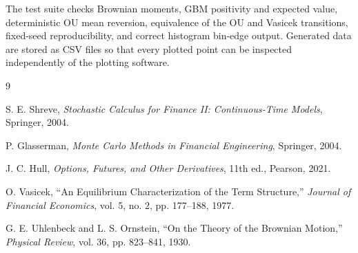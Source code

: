 \documentclass[11pt,a4paper]{article}
\begin{document}
The test suite checks Brownian moments, GBM positivity and expected value, deterministic OU mean reversion, equivalence of the OU and Vasicek transitions, fixed-seed reproducibility, and correct histogram bin-edge output. Generated data are stored as CSV files so that every plotted point can be inspected independently of the plotting software.

\begin{thebibliography}{9}

S. E. Shreve,
\textit{Stochastic Calculus for Finance II: Continuous-Time Models},
Springer, 2004.

P. Glasserman,
\textit{Monte Carlo Methods in Financial Engineering},
Springer, 2004.

J. C. Hull,
\textit{Options, Futures, and Other Derivatives}, 11th ed.,
Pearson, 2021.

O. Vasicek,
``An Equilibrium Characterization of the Term Structure,''
\textit{Journal of Financial Economics}, vol. 5, no. 2, pp. 177--188, 1977.

G. E. Uhlenbeck and L. S. Ornstein,
``On the Theory of the Brownian Motion,''
\textit{Physical Review}, vol. 36, pp. 823--841, 1930.

\end{thebibliography}
\end{document}
